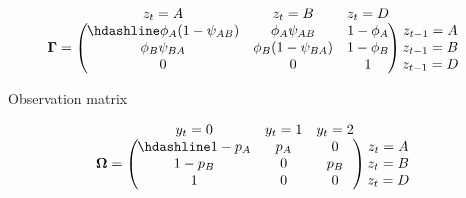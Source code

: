 \documentclass[
  12pt,
]{krantz}
\begin{document}
\[
\begin{matrix}
& \\
\mathbf{\Gamma} =
\left ( \vphantom{ \begin{matrix} 12 \\ 12 \\ 12 \end{matrix} } \right .
\end{matrix}
\hspace{-1.2em}
\begin{matrix}
z_t=A & z_t=B & z_t=D \\ \hdashline
\phi_A (1-\psi_{AB}) & \phi_A \psi_{AB} & 1 - \phi_A\\
\phi_B \psi_{BA} & \phi_B (1-\psi_{BA}) & 1 - \phi_B\\
0 & 0 & 1
\end{matrix}
\hspace{-0.2em}
\begin{matrix}
& \\
\left . \vphantom{ \begin{matrix} 12 \\ 12 \\ 12 \end{matrix} } \right )
\begin{matrix}
z_{t-1}=A \\ z_{t-1}=B \\ z_{t-1}=D
\end{matrix}
\end{matrix}
\]

Observation matrix

\[
\begin{matrix}
& \\
\mathbf{\Omega} =
\left ( \vphantom{ \begin{matrix} 12 \\ 12 \\ 12 \end{matrix} } \right .
\end{matrix}
\hspace{-1.2em}
\begin{matrix}
y_t=0 & y_t=1 & y_t=2 \\ \hdashline
1 - p_A & p_A & 0\\
1 - p_B & 0 & p_B\\
1 & 0 & 0
\end{matrix}
\hspace{-0.2em}
\begin{matrix}
& \\
\left . \vphantom{ \begin{matrix} 12 \\ 12 \\ 12 \end{matrix} } \right )
\begin{matrix}
z_{t}=A \\ z_{t}=B \\ z_{t}=D
\end{matrix}
\end{matrix}
\]
\end{document}
